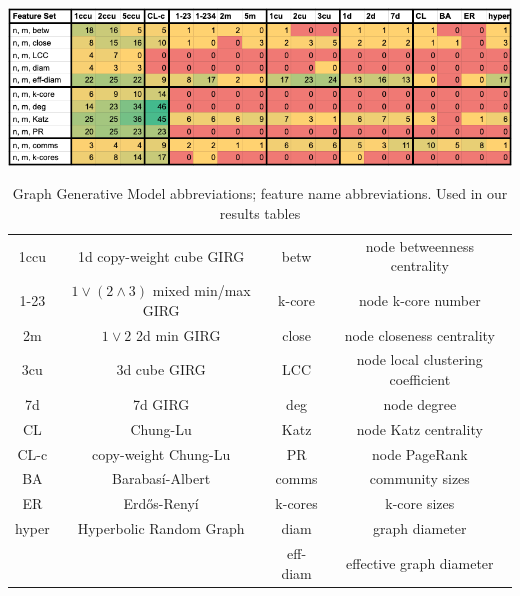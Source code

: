 \begin{table}
    \centering
    \includegraphics[width=\textwidth]{./figures/Blasius_framework_table.png}
    \caption{GGM realism framework results on Facebook graphs, extended to different GIRG models. Shown here are distribution based features, i.e. including mean, median, lower quartile, upper quartile and standard deviation of node level features.
    Some models are excluded from the table e.g. 3d-6d GIRGs as their results follow a trend from low to high dimension.
    }
    \label{fig:blasius_framework_table}
    \vspace{1em}
    \centering
    \begin{tabular}{|c|c||c|c|}
        \hline
        1ccu & 1d copy-weight cube GIRG 
        & betw & node betweenness centrality
        \\
        1-23 & $1 \lor (2 \land 3)$ mixed min/max GIRG
        & k-core & node k-core number
        \\
        2m & $1 \lor 2$ 2d min GIRG
        & close & node closeness centrality
        \\
        3cu & 3d cube GIRG
        & LCC & node local clustering coefficient
        \\
        7d & 7d GIRG
        & deg & node degree
        \\
        CL & Chung-Lu
        & Katz & node Katz centrality
        \\
        CL-c & copy-weight Chung-Lu
        & PR & node PageRank
        \\
        BA & Barabas{\'i}-Albert
        & comms & community sizes
        \\
        ER & Erd\H{o}s-Reny{\'i}
        & k-cores & k-core sizes
        \\
        hyper & Hyperbolic Random Graph &
        diam & graph diameter
        \\
        && eff-diam & effective graph diameter\\
        \hline
    \end{tabular}
    \caption{Graph Generative Model abbreviations; feature name abbreviations. Used in our results tables}
\end{table}

